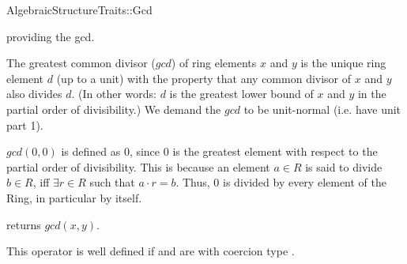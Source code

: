 \begin{ccRefConcept}{AlgebraicStructureTraits::Gcd}

\ccDefinition

 providing the gcd. 

The greatest common divisor ($gcd$) of ring elements $x$ and $y$ is the unique 
ring element $d$ (up to a unit) with the property that any common divisor of 
$x$ and $y$ also divides $d$. (In other words: $d$ is the greatest lower bound 
of $x$ and $y$ in the partial order of divisibility.) We demand the $gcd$ to be 
unit-normal (i.e. have unit part 1). 

$gcd(0,0)$ is defined as $0$, since $0$ is the greatest element with respect 
to the partial order of divisibility. This is because an element $a \in R$ is said to divide $b \in R$, iff $\exists r \in R$ such that $a \cdot r = b$. 
Thus, $0$ is divided by every element of the Ring, in particular by itself. 

\ccRefines 


\ccTypes

\ccGlue
{}\ccGlue
{}

\ccOperations
{}
        { returns  $gcd(x,y)$. }

         {This operator is well defined if  and  are  
          with coercion type . }


\ccSeeAlso


\end{ccRefConcept} 
